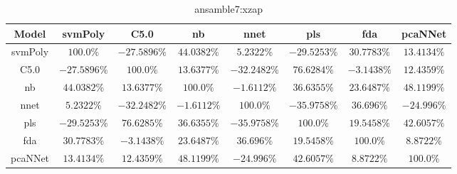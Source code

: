 \begin{table}[!ht]
	\centering
	\begin{tabular}{|c|c|c|c|c|c|c|c|}
		\hline
		Model & svmPoly & C5.0 & nb & nnet & pls & fda & pcaNNet \\ \hline
		svmPoly & $100.0\%$ & $-27.5896\%$ & $44.0382\%$ & $5.2322\%$ & $-29.5253\%$ & $30.7783\%$ & $13.4134\%$ \\ \hline
		C5.0 & $-27.5896\%$ & $100.0\%$ & $13.6377\%$ & $-32.2482\%$ & $76.6284\%$ & $-3.1438\%$ & $12.4359\%$ \\ \hline
		nb & $44.0382\%$ & $13.6377\%$ & $100.0\%$ & $-1.6112\%$ & $36.6355\%$ & $23.6487\%$ & $48.1199\%$ \\ \hline
		nnet & $5.2322\%$ & $-32.2482\%$ & $-1.6112\%$ & $100.0\%$ & $-35.9758\%$ & $36.696\%$ & $-24.996\%$ \\ \hline
		pls & $-29.5253\%$ & $76.6285\%$ & $36.6355\%$ & $-35.9758\%$ & $100.0\%$ & $19.5458\%$ & $42.6057\%$ \\ \hline
		fda & $30.7783\%$ & $-3.1438\%$ & $23.6487\%$ & $36.696\%$ & $19.5458\%$ & $100.0\%$ & $8.8722\%$ \\ \hline
		pcaNNet & $13.4134\%$ & $12.4359\%$ & $48.1199\%$ & $-24.996\%$ & $42.6057\%$ & $8.8722\%$ & $100.0\%$ \\ \hline
	\end{tabular}
	\caption{ansamble7:xzap}
	\label{tab:ansamble7:xzap}
\end{table}
